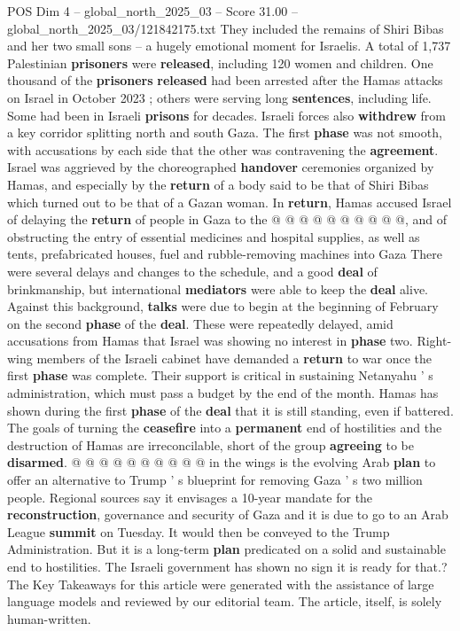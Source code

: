 \begin{textsample}{POS Dim 4 – global\_north\_2025\_03 – Score 31.00 – global\_north\_2025\_03/121842175.txt}
They included the remains of Shiri Bibas and her two small sons -- a hugely emotional moment for Israelis.
A total of 1,737 Palestinian \textbf{prisoners} were \textbf{released}, including 120 women and children.
One thousand of the \textbf{prisoners} \textbf{released} had been arrested after the Hamas attacks on Israel in October 2023 ; others were serving long \textbf{sentences}, including life.
Some had been in Israeli \textbf{prisons} for decades.
Israeli forces also \textbf{withdrew} from a key corridor splitting north and south Gaza.
The first \textbf{phase} was not smooth, with accusations by each side that the other was contravening the \textbf{agreement}.
Israel was aggrieved by the choreographed \textbf{handover} ceremonies organized by Hamas, and especially by the \textbf{return} of a body said to be that of Shiri Bibas which turned out to be that of a Gazan woman.
In \textbf{return}, Hamas accused Israel of delaying the \textbf{return} of people in Gaza to the @ @ @ @ @ @ @ @ @ @, and of obstructing the entry of essential medicines and hospital supplies, as well as tents, prefabricated houses, fuel and rubble-removing machines into Gaza There were several delays and changes to the schedule, and a good \textbf{deal} of brinkmanship, but international \textbf{mediators} were able to keep the \textbf{deal} alive.
Against this background, \textbf{talks} were due to begin at the beginning of February on the second \textbf{phase} of the \textbf{deal}.
These were repeatedly delayed, amid accusations from Hamas that Israel was showing no interest in \textbf{phase} two.
Right-wing members of the Israeli cabinet have demanded a \textbf{return} to war once the first \textbf{phase} was complete.
Their support is critical in sustaining Netanyahu ' s administration, which must pass a budget by the end of the month.
Hamas has shown during the first \textbf{phase} of the \textbf{deal} that it is still standing, even if battered.
The goals of turning the \textbf{ceasefire} into a \textbf{permanent} end of hostilities and the destruction of Hamas are irreconcilable, short of the group \textbf{agreeing} to be \textbf{disarmed}. @ @ @ @ @ @ @ @ @ @ in the wings is the evolving Arab \textbf{plan} to offer an alternative to Trump ' s blueprint for removing Gaza ' s two million people.
Regional sources say it envisages a 10-year mandate for the \textbf{reconstruction}, governance and security of Gaza and it is due to go to an Arab League \textbf{summit} on Tuesday.
It would then be conveyed to the Trump Administration.
But it is a long-term \textbf{plan} predicated on a solid and sustainable end to hostilities.
The Israeli government has shown no sign it is ready for that.?
The Key Takeaways for this article were generated with the assistance of large language models and reviewed by our editorial team.
The article, itself, is solely human-written.


\end{textsample}
